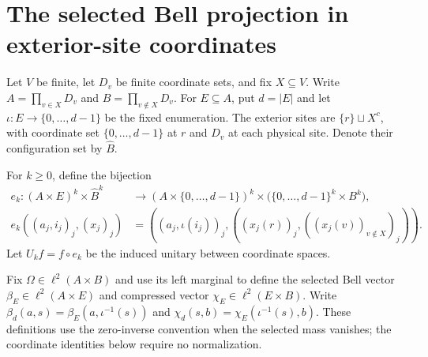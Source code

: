 \section{The selected Bell projection in exterior-site coordinates}
\label{sec:schmidt_bell_site_pin}

Let $V$ be finite, let $D_v$ be finite coordinate sets, and fix $X\subseteq V$.
Write $A=\prod_{v\in X}D_v$ and $B=\prod_{v\notin X}D_v$.
For $E\subseteq A$, put $d=|E|$ and let $\iota:E\to\{0,\ldots,d-1\}$
be the fixed enumeration. The exterior sites are $\{r\}\sqcup X^c$, with
coordinate set $\{0,\ldots,d-1\}$ at $r$ and $D_v$ at each physical site.
Denote their configuration set by $\widehat B$.

\begin{definition}
    \label{def:schmidt_bell_site_coordinates}
    \leanok
    For $k\ge0$, define the bijection
    \begin{align*}
        e_k:(A\times E)^k\times\widehat B^k
        &\longrightarrow (A\times\{0,\ldots,d-1\})^k
        \times\bigl(\{0,\ldots,d-1\}^k\times B^k\bigr),\\
        e_k((a_j,i_j)_j,(x_j)_j)
        &=((a_j,\iota(i_j))_j,((x_j(r))_j,((x_j(v))_{v\notin X})_j)).
    \end{align*}
    Let $U_k f=f\circ e_k$ be the induced unitary between coordinate spaces.
\end{definition}

Fix $\Omega\in\ell^2(A\times B)$ and use its left marginal to define the
selected Bell vector $\beta_E\in\ell^2(A\times E)$ and compressed vector
$\chi_E\in\ell^2(E\times B)$.
Write $\beta_d(a,s)=\beta_E(a,\iota^{-1}(s))$ and
$\chi_d(s,b)=\chi_E(\iota^{-1}(s),b)$.
These definitions use the zero-inverse convention when the selected mass
vanishes; the coordinate identities below require no normalization.

